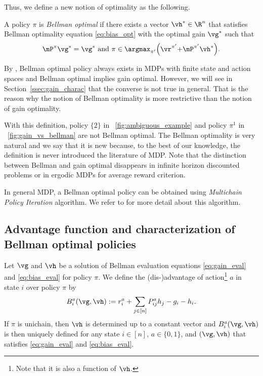 Thus, we define a new notion of optimality as the following.
\begin{defn}
    A policy $\pi$ is \emph{Bellman optimal} if there exists a vector $\vh^*\in\R^n$ that satisfies Bellman optimality equation \eqref{eq:bias_opt} with the optimal gain $\vg^*$ such that
    \begin{equation}
        \label{ch:idx:eq:bell}
        \mP^\pi\vg^*=\vg^* \text{ and } \pi\in\argmax_{\pi'}\Bigl(\vr^{\pi'}{+}\mP^{\pi'}\vh^*\Bigr).
    \end{equation}
    \label{ch:idx:defn:bell}
\end{defn}
By \cite[Theorem~9.1.7]{puterman2014markov}, Bellman optimal policy always exists in MDPs with finite state and action spaces and Bellman optimal implies gain optimal.
However, we will see in Section~\ref{ssec:gain_charac} that the converse is not true in general.
That is the reason why the notion of Bellman optimality is more restrictive than the notion of gain optimality.

With this definition, policy $\{2\}$ in \figurename~\ref{fig:ambiguous_example} and policy $\pi^1$ in \figurename~\ref{fig:gain_vs_bellman} are not Bellman optimal.
The Bellman optimality is very natural and we say that it is new because, to the best of our knowledge, the definition is never introduced the literature of MDP.
Note that the distinction between Bellman and gain optimal disappears in infinite horizon discounted problems or in ergodic MDPs for average reward criterion.

In general MDP, a Bellman optimal policy can be obtained using \emph{Multichain Policy Iteration} algorithm.
We refer to \cite[Section~9.2.1]{puterman2014markov} for more detail about this algorithm.

\subsection{Advantage function and characterization of Bellman optimal policies}

Let $\vg$ and $\vh$ be a solution of Bellman evaluation equations \eqref{eq:gain_eval} and \eqref{eq:bias_eval} for policy $\pi$.
We define the (dis-)advantage of action\footnote{Note that it is also a function of $\vh$.} $a$ in state $i$ over policy $\pi$ by
\begin{equation}
    \label{ch:idx:eq:advan}
    B^a_i(\vg,\vh) := r^a_i +\sum_{j\in[n]}P^a_{ij}h_j -g_i -h_i.
\end{equation}
If $\pi$ is unichain, then $\vh$ is determined up to a constant vector and $B^a_i(\vg,\vh)$ is then uniquely defined for any state $i\in[n]$, $a\in\{0,1\}$, and $(\vg,\vh)$ that satisfies \eqref{eq:gain_eval} and \eqref{eq:bias_eval}.

